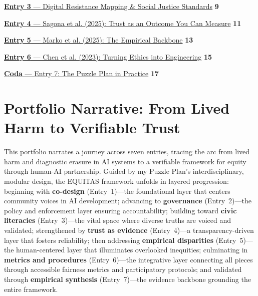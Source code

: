 \documentclass[11pt,twoside]{article}
\begin{document}
\noindent\hyperref[entry3]{\textbf{Entry 3} --- Digital Resistance Mapping \& Social Justice Standards} \dotfill \textbf{9}

\vspace{0.15cm}

\noindent\hyperref[entry4]{\textbf{Entry 4} --- Sagona et al. (2025): Trust as an Outcome You Can Measure} \dotfill \textbf{11}

\vspace{0.15cm}

\noindent\hyperref[entry5]{\textbf{Entry 5} --- Marko et al. (2025): The Empirical Backbone} \dotfill \textbf{13}

\vspace{0.15cm}

\noindent\hyperref[entry6]{\textbf{Entry 6} --- Chen et al. (2023): Turning Ethics into Engineering} \dotfill \textbf{15}

\vspace{0.15cm}

\noindent\hyperref[coda]{\textbf{Coda} --- Entry 7: The Puzzle Plan in Practice} \dotfill \textbf{17}


\pagestyle{fancy}

\newpage


\label{sec:narrative}
\section*{Portfolio Narrative: From Lived Harm to Verifiable Trust}

\noindent This portfolio narrates a journey across seven entries, tracing the arc from lived harm and diagnostic erasure in AI systems to a verifiable framework for equity through human-AI partnership. Guided by my Puzzle Plan's interdisciplinary, modular design, the EQUITAS framework unfolds in layered progression: beginning with \textbf{co-design} (Entry~1)---the foundational layer that centers community voices in AI development; advancing to \textbf{governance} (Entry~2)---the policy and enforcement layer ensuring accountability; building toward \textbf{civic literacies} (Entry~3)---the vital space where diverse truths are voiced and validated; strengthened by \textbf{trust as evidence} (Entry~4)---a transparency-driven layer that fosters reliability; then addressing \textbf{empirical disparities} (Entry~5)---the human-centered layer that illuminates overlooked inequities; culminating in \textbf{metrics and procedures} (Entry~6)---the integrative layer connecting all pieces through accessible fairness metrics and participatory protocols; and validated through \textbf{empirical synthesis} (Entry~7)---the evidence backbone grounding the entire framework.
\end{document}
